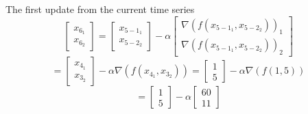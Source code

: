 \documentclass[10pt]{elsarticle}
\theoremstyle{remark}
\begin{document}
The first update from the current time series
\[
\begin{bmatrix}
    x_{6_1}\\
    x_{6_2}
\end{bmatrix} = 
\begin{bmatrix}
    x_{{5-1}_{1}}\\
    x_{{5-2}_{2}}   
\end{bmatrix} - \alpha
\begin{bmatrix}
    \nabla(f(x_{{5-1}_{1}},x_{{5-2}_{2}}))_{1} \\
    \nabla(f(x_{{5-1}_{1}},x_{{5-2}_{2}}))_{2}
\end{bmatrix}
\]
\[
 = 
\begin{bmatrix}
   x_{{4}_{1}} \\
   x_{{3}_{2}}
\end{bmatrix} - \alpha
\nabla(f(x_{{4}_{1}},x_{{3}_{2}})) = 
\begin{bmatrix}
    1 \\
    5
\end{bmatrix} - \alpha
\nabla(f(1,5))
\]
\[
 = 
\begin{bmatrix}
    1 \\
    5
\end{bmatrix} - \alpha
\begin{bmatrix}
    60 \\
    11 
\end{bmatrix}
\]
\end{document}
